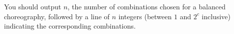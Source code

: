 You should output $n$, the number of combinations chosen for a balanced choreography, followed by a line of $n$ integers (between $1$ and $2^c$ inclusive) indicating the corresponding combinations.
